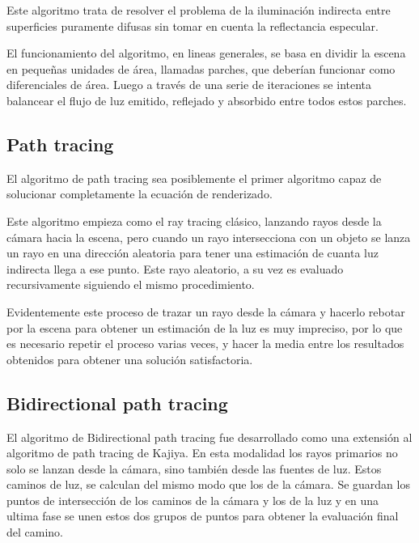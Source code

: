 \medskip

Este algoritmo trata de resolver el problema de la iluminación indirecta entre superficies puramente difusas sin tomar en cuenta la reflectancia especular.

\medskip

El funcionamiento del algoritmo, en lineas generales, se basa en dividir la escena en pequeñas unidades de área, llamadas parches, que deberían funcionar como diferenciales de área. Luego a través de una serie de iteraciones se intenta balancear el flujo de luz emitido, reflejado y absorbido entre todos estos parches.

\clearpage

\subsection{Path tracing}

El algoritmo de path tracing \cite{Kajiya1986} sea posiblemente el primer algoritmo capaz de solucionar completamente la ecuación de renderizado.

\medskip

Este algoritmo empieza como el ray tracing clásico, lanzando rayos desde la cámara hacia la escena, pero cuando un rayo intersecciona con un objeto se lanza un rayo en una dirección aleatoria para tener una estimación de cuanta luz indirecta llega a ese punto. Este rayo aleatorio, a su vez es evaluado recursivamente siguiendo el mismo procedimiento. 

\medskip 

Evidentemente este proceso de trazar un rayo desde la cámara y hacerlo rebotar por la escena para obtener un estimación de la luz es muy impreciso, por lo que es necesario repetir el proceso varias veces, y hacer la media entre los resultados obtenidos para obtener una solución satisfactoria. 

\subsection{Bidirectional path tracing}

El algoritmo de Bidirectional path tracing \cite{Lafortune1993} fue desarrollado como una extensión al algoritmo de path tracing de Kajiya. En esta modalidad los rayos primarios no solo se lanzan desde la cámara, sino también desde las fuentes de luz. Estos caminos de luz, se calculan del mismo modo que los de la cámara. Se guardan los puntos de intersección de los caminos de la cámara y los de la luz y en una ultima fase se unen estos dos grupos de puntos para obtener la evaluación final del camino.

